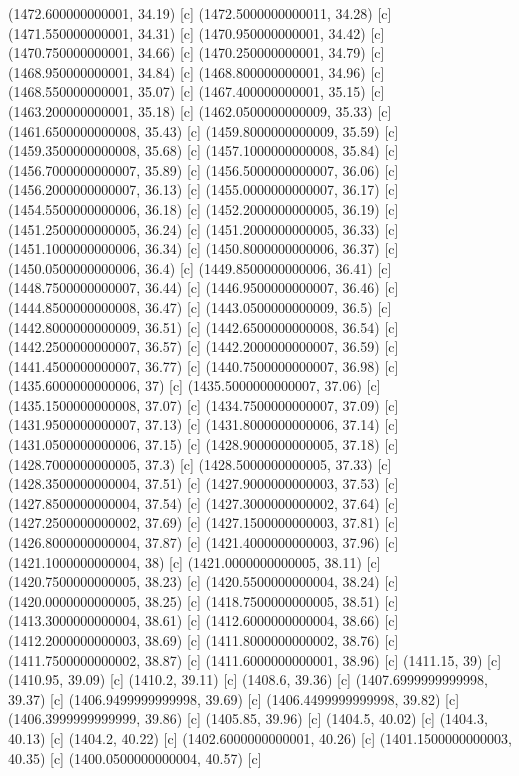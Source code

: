 {{{(1472.600000000001, 34.19) [c] 
(1472.5000000000011, 34.28) [c] 
(1471.550000000001, 34.31) [c] 
(1470.950000000001, 34.42) [c] 
(1470.750000000001, 34.66) [c] 
(1470.250000000001, 34.79) [c] 
(1468.950000000001, 34.84) [c] 
(1468.800000000001, 34.96) [c] 
(1468.550000000001, 35.07) [c] 
(1467.400000000001, 35.15) [c] 
(1463.200000000001, 35.18) [c] 
(1462.0500000000009, 35.33) [c] 
(1461.6500000000008, 35.43) [c] 
(1459.8000000000009, 35.59) [c] 
(1459.3500000000008, 35.68) [c] 
(1457.1000000000008, 35.84) [c] 
(1456.7000000000007, 35.89) [c] 
(1456.5000000000007, 36.06) [c] 
(1456.2000000000007, 36.13) [c] 
(1455.0000000000007, 36.17) [c] 
(1454.5500000000006, 36.18) [c] 
(1452.2000000000005, 36.19) [c] 
(1451.2500000000005, 36.24) [c] 
(1451.2000000000005, 36.33) [c] 
(1451.1000000000006, 36.34) [c] 
(1450.8000000000006, 36.37) [c] 
(1450.0500000000006, 36.4) [c] 
(1449.8500000000006, 36.41) [c] 
(1448.7500000000007, 36.44) [c] 
(1446.9500000000007, 36.46) [c] 
(1444.8500000000008, 36.47) [c] 
(1443.0500000000009, 36.5) [c] 
(1442.8000000000009, 36.51) [c] 
(1442.6500000000008, 36.54) [c] 
(1442.2500000000007, 36.57) [c] 
(1442.2000000000007, 36.59) [c] 
(1441.4500000000007, 36.77) [c] 
(1440.7500000000007, 36.98) [c] 
(1435.6000000000006, 37) [c] 
(1435.5000000000007, 37.06) [c] 
(1435.1500000000008, 37.07) [c] 
(1434.7500000000007, 37.09) [c] 
(1431.9500000000007, 37.13) [c] 
(1431.8000000000006, 37.14) [c] 
(1431.0500000000006, 37.15) [c] 
(1428.9000000000005, 37.18) [c] 
(1428.7000000000005, 37.3) [c] 
(1428.5000000000005, 37.33) [c] 
(1428.3500000000004, 37.51) [c] 
(1427.9000000000003, 37.53) [c] 
(1427.8500000000004, 37.54) [c] 
(1427.3000000000002, 37.64) [c] 
(1427.2500000000002, 37.69) [c] 
(1427.1500000000003, 37.81) [c] 
(1426.8000000000004, 37.87) [c] 
(1421.4000000000003, 37.96) [c] 
(1421.1000000000004, 38) [c] 
(1421.0000000000005, 38.11) [c] 
(1420.7500000000005, 38.23) [c] 
(1420.5500000000004, 38.24) [c] 
(1420.0000000000005, 38.25) [c] 
(1418.7500000000005, 38.51) [c] 
(1413.3000000000004, 38.61) [c] 
(1412.6000000000004, 38.66) [c] 
(1412.2000000000003, 38.69) [c] 
(1411.8000000000002, 38.76) [c] 
(1411.7500000000002, 38.87) [c] 
(1411.6000000000001, 38.96) [c] 
(1411.15, 39) [c] 
(1410.95, 39.09) [c] 
(1410.2, 39.11) [c] 
(1408.6, 39.36) [c] 
(1407.6999999999998, 39.37) [c] 
(1406.9499999999998, 39.69) [c] 
(1406.4499999999998, 39.82) [c] 
(1406.3999999999999, 39.86) [c] 
(1405.85, 39.96) [c] 
(1404.5, 40.02) [c] 
(1404.3, 40.13) [c] 
(1404.2, 40.22) [c] 
(1402.6000000000001, 40.26) [c] 
(1401.1500000000003, 40.35) [c] 
(1400.0500000000004, 40.57) [c] 
}}}
